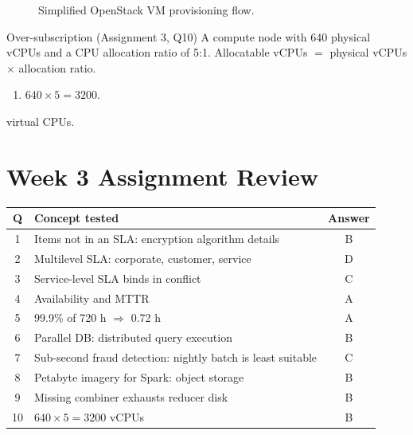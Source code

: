 \begin{figure}[H]
\centering
{}
\caption{Simplified OpenStack VM provisioning flow.}
\end{figure}

\begin{solved}{Over-subscription (Assignment 3, Q10)}
\Given A compute node with 640 physical vCPUs and a CPU allocation ratio of 5:1.
\Formula Allocatable vCPUs $=$ physical vCPUs $\times$ allocation ratio.
\Steps
\begin{enumerate}[leftmargin=*]
  \item $640 \times 5 = 3200$.
\end{enumerate}
 virtual CPUs.
\end{solved}

\section{Week 3 Assignment Review}
\begin{center}
\begin{tabularx}{\textwidth}{cXc}
\toprule
Q & Concept tested & Answer\\
\midrule
1 & Items not in an SLA: encryption algorithm details & B\\
2 & Multilevel SLA: corporate, customer, service & D\\
3 & Service-level SLA binds in conflict & C\\
4 & Availability and MTTR & A\\
5 & 99.9\% of 720 h $\Rightarrow$ 0.72 h & A\\
6 & Parallel DB: distributed query execution & B\\
7 & Sub-second fraud detection: nightly batch is least suitable & C\\
8 & Petabyte imagery for Spark: object storage & B\\
9 & Missing combiner exhausts reducer disk & B\\
10 & $640 \times 5 = 3200$ vCPUs & B\\
\bottomrule
\end{tabularx}
\end{center}
